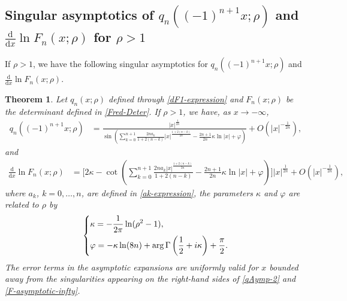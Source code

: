 \documentclass[11pt,a4paper]{article}
\newtheorem{thm}{Theorem}[section]
\numberwithin{equation}{section}
\def\arg {\mathop{\rm arg}\nolimits}
\begin{document}
\subsection{Singular asymptotics of $q_{n}((-1)^{n+1}x;\rho)$ and $\frac{\mathrm{d}}{\mathrm{d}x}\ln F_n(x;\rho)$ for $\rho>1$}
If $\rho>1$, we have the following singular  asymptotics for  $q_{n}((-1)^{n+1}x;\rho)$ and $\frac{\mathrm{d}}{\mathrm{d}x}\ln F_n(x;\rho)$.
\begin{thm}\label{thm1}
Let $q_{n}(x;\rho)$ %
defined through \eqref{dF1-expression}
and $F_n(x;\rho)$ be the determinant defined in \eqref{Fred-Deter}. If $\rho>1$, we have, as $x\to-\infty$,
\begin{align}\label{qAymp-2}
q_{n}\left((-1)^{n+1}x;\rho\right)&=\frac{|x|^{\frac{1}{2n}}}
{\sin\left(\sum_{k=0}^{n+1}\frac{2na_k}{1+2(n-k)}|x|^{\frac{1+2(n-k)}{2n}}
-\frac{2n+1}{2n}\kappa\ln|x|+\varphi\right)}+O\left(|x|^{-\frac{1}{2n}}\right),
\end{align}
and
\begin{align}\label{F-asymptotic-infty}
\frac{\mathrm{d}}{\mathrm{d}x}\ln F_n(x;\rho)&=\Bigg[2\kappa
-\cot\left(\sum_{k=0}^{n+1}\frac{2na_k|x|^{\frac{1+2(n-k)}{2n}}}{1+2(n-k)}
-\frac{2n+1}{2n}\kappa\ln|x|+\varphi\right)
\Bigg]|x|^{\frac{1}{2n}}+O\left(|x|^{-\frac{1}{2n}}\right),
\end{align}
where $a_k$, $k=0,\ldots,n$, are defined in \eqref{ak-expression}, the parameters $\kappa$ and $\varphi$ are related to $\rho$ by
\begin{equation}\label{kappa}
\left\{\begin{aligned}
&\kappa=-\frac{1}{2\pi}\ln(\rho^2-1),\\
&\varphi=-\kappa\ln(8n)+\arg\Gamma\left(\frac{1}{2}+i\kappa\right)
+\frac{\pi}{2}.
\end{aligned}\right.
\end{equation}
The error terms in the asymptotic expansions are uniformly valid for $x$ bounded away from the singularities appearing on the right-hand sides of \eqref{qAymp-2} and \eqref{F-asymptotic-infty}.  \end{thm}
\end{document}
